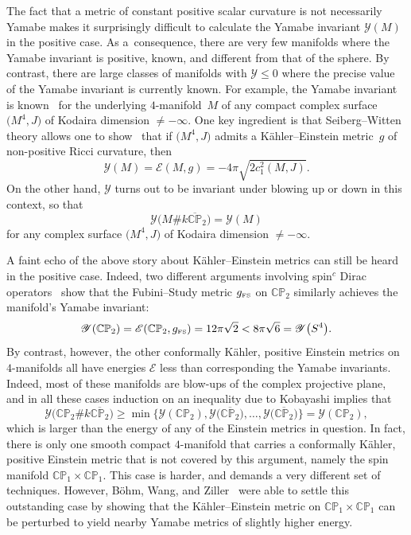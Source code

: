 \documentclass[pdftex]{sigma}
\numberwithin{equation}{section}
\def\CP{\mathbb{CP}}
\begin{document}
The fact that a metric of constant positive scalar curvature is not necessarily Yamabe makes it surprisingly difficult
to calculate the Yamabe invariant $\mathscr{Y}(M)$ in the positive case. As a~consequence, there are very few manifolds
where the Yamabe invariant is positive, known, and different from that of the sphere. By contrast, there are
large classes of manifolds with $\mathscr{Y}\leq 0$ where the precise value of the Yamabe invariant is currently known.
For example, the Yamabe invariant is known~\cite{albaleb,lky} for the underlying $4$-manifold~$M$ of any compact complex surface $\big(M^4,J\big)$
of Kodaira dimension $\neq -\infty$. One key ingredient is that Seiberg--Witten theory allows one to show~\cite{lno} that
if $\big(M^4,J\big)$ admits a K\"ahler--Einstein metric~$g$ of non-positive Ricci curvature, then
\begin{equation*}
\mathscr{Y} (M) = \mathscr{E}(M, g)=
-4\pi\sqrt{2 c_1^2 (M,J)}.
\end{equation*}
On the other hand, $\mathscr{Y}$ turns out to be invariant under blowing up or down in this context, so that \cite{albaleb,lno,lky}
\begin{equation*}
\mathscr{Y} \big(M\# k \overline{\CP}_2\big) =\mathscr{Y} (M)
\end{equation*}
for any complex surface $\big(M^4,J\big)$ of Kodaira dimension $\neq -\infty$.

A faint echo of the
 above story about K\"ahler--Einstein metrics can still be heard in the positive case. Indeed, two different arguments involving
 spin$^c$ Dirac operators~\cite{gl1,lcp2} show that the Fubini--Study metric $g_{\text{\tiny FS}}$ on $\CP_2$ similarly
achieves the manifold's Yamabe invariant:
\begin{equation*}
\mathscr{Y} (\CP_2) = \mathscr{E}(\CP_2, g_{\text{\tiny FS}})= 12\pi \sqrt{2} < 8 \pi \sqrt{6} = \mathscr{Y} \big(S^4\big).
\end{equation*}
By contrast, however, the other conformally K\"ahler, positive
Einstein metrics on $4$-manifolds \cite{chenlebweb,lebuniq,sunspot,page,ty} all have energies $\mathscr{E}$ less than corresponding the Yamabe invariants.
 Indeed, most of these manifolds are blow-ups of the complex projective plane, and in all these cases induction on an inequality due to Kobayashi \cite[Theorem 2]{okob} implies that
 \begin{equation*}
\mathscr{Y} \big(\CP_2\# k \overline{\CP_2}\big) \geq \min \big\{ \mathscr{Y} (\CP_2), \mathscr{Y} \big( \overline{\CP_2}\big), \ldots , \mathscr{Y} \big( \overline{\CP_2}\big)\big\} = \mathscr{Y} (\CP_2),
\end{equation*}
which is larger than the energy of any of the Einstein metrics in question.
In fact, there is only one smooth compact $4$-manifold that carries a conformally K\"ahler, positive Einstein metric that is not covered by this argument, namely the
spin manifold $\CP_1 \times \CP_1$. This case is harder, and demands a very different set of techniques. However,
 B\"ohm, Wang, and Ziller~\cite{bwz} were able to settle this outstanding case by showing that the K\"ahler--Einstein metric on $\CP_1 \times \CP_1$ can be perturbed to yield
nearby Yamabe metrics of slightly higher energy.
\end{document}
